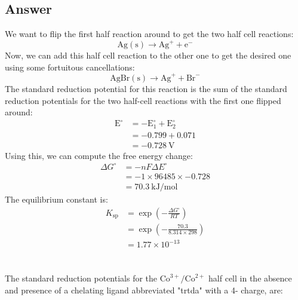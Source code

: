 \documentclass[12pt]{article}
\begin{document}
\subsection{Answer}
We want to flip the first half reaction around to get the two half cell reactions:
\begin{equation}
\mathrm{Ag}(\mathrm{s}) \rightarrow \mathrm{Ag}^{+}+\mathrm{e}^{-}
\end{equation}
Now, we can add this half cell reaction to the other one to get the desired one using some fortuitous cancellations:
\begin{equation}
\mathrm{AgBr}(\mathrm{s}) \rightarrow \mathrm{Ag}^{+}+\mathrm{Br}^{-}
\end{equation}
The standard reduction potential for this reaction is the sum of the standard reduction potentials for the two half-cell reactions with the first one flipped around:
\begin{equation}
\begin{aligned}
\mathrm{E}^{\circ} &=-\mathrm{E}_{1}^{\circ}+\mathrm{E}_{2}^{\circ} \\
&=-0.799+0.071 \\
&=-0.728 \mathrm{~V}
\end{aligned}
\end{equation}
Using this, we can compute the free energy change:
\begin{equation}
\begin{aligned}
\Delta G^{\circ} &=-n F \Delta E^{\circ} \\
&=-1 \times 96485 \times -0.728 \\
&=70.3 \mathrm{~kJ} / \mathrm{mol}
\end{aligned}
\end{equation}
The equilibrium constant is:
\begin{equation}
\begin{aligned}
K_{\mathrm{sp}} &=\exp \left(-\frac{\Delta G^{\circ}}{R T}\right) \\
&=\exp \left(-\frac{70.3}{8.314 \times 298}\right) \\
&=1.77 \times 10^{-13}
\end{aligned}
\end{equation}


\section{}
The standard reduction potentials for the $\mathrm{Co}^{3+} / \mathrm{Co}^{2+}$ half cell in the absence and presence of a chelating ligand abbreviated "trtda" with a 4- charge, are:
\end{document}
